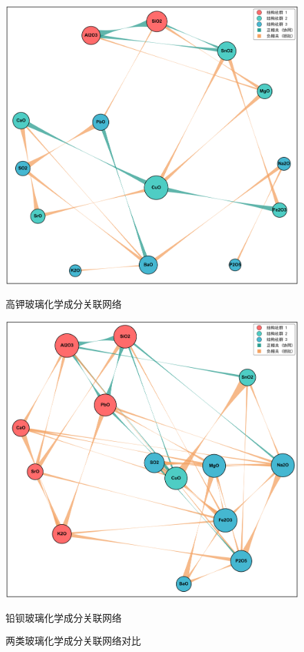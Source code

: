 \begin{figure}[htbp]
    \centering
    \begin{minipage}[b]{0.48\textwidth}
        \centering
        \includegraphics[width=\textwidth]{figs/6问题四/高钾_Network_Final_Soft_Bright.png}
        \caption*{高钾玻璃化学成分关联网络}
    \end{minipage}
    \hfill
    \begin{minipage}[b]{0.48\textwidth}
        \centering
        \includegraphics[width=\textwidth]{figs/6问题四/铅钡_Network_Final_Soft_Bright.png}
        \caption*{铅钡玻璃化学成分关联网络}
    \end{minipage}
    \caption{两类玻璃化学成分关联网络对比}
    \label{fig:networks}
\end{figure}


